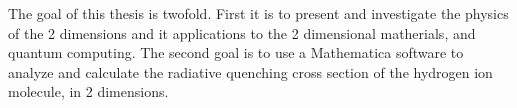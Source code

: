 
The goal of this thesis is twofold. First it is to present and investigate the physics of the 2 dimensions and it applications to the 2 dimensional matherials, and quantum computing.
The second goal is to use a Mathematica software to analyze and calculate the radiative quenching cross section of the hydrogen ion molecule, in 2 dimensions.
